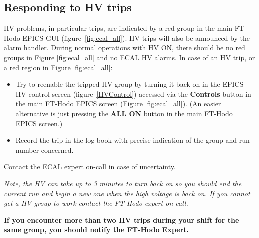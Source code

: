 \documentclass[12pt]{article}
\begin{document}
   

   \subsection{Responding to HV trips}

   HV problems, in particular trips, are indicated by a red group in the main FT-Hodo EPICS GUI (figure~\ref{fig:ecal_all}).  HV trips will also be announced by the alarm handler.  During normal operations with HV ON, there should be no red groups in Figure \ref{fig:ecal_all} and no ECAL HV alarms.  In case of an HV trip, or a red region in Figure \ref{fig:ecal_all}:
\begin{itemize}
    \item Try to reenable the tripped HV group by turning it back on in the EPICS HV control screen (figure~\ref{HVControl}) accessed via the {\bf Controls} button in the main FT-Hodo EPICS screen (Figure \ref{fig:ecal_all}).  (An easier alternative is just pressing the {\bf ALL ON}
button in the main FT-Hodo EPICS screen.)
    \item Record the trip in the log book with precise indication of the group and run
        number concerned. 
\end{itemize}
Contact the ECAL expert on-call in case of uncertainty.
      
      {\em Note, the HV can take up to 3 minutes to turn back on so you should end the current run and begin a new one when the high voltage is back on. If you cannot get a HV group to work contact the FT-Hodo expert on call.}

      {\bf If you encounter more than two HV trips during your shift for the same group, you should notify the FT-Hodo Expert.}
\end{document}
